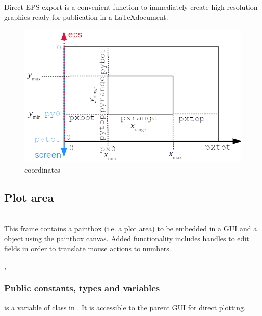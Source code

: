 \documentclass[12pt]{article}
\newcommand\code[1]{{\tt #1}}
\newcommand\guifco[1]{{\color{violet}\code{#1}}}
\newcommand{\opaguif}[1]{\colorbox{violet!30}{{\color{black}\code{#1}}}}
\newcommand{\oguifh}[2]{\subsection{\label{#2}#1}{\Huge\opaguif{#2}}\\}
\newcommand{\oguif}[1]{\hyperref[#1]{\opaguif{#1}}}
\newcommand{\opauni}[1]{\colorbox{orange!30}{{\color{black}\code{#1}}}}
\newcommand{\ouni}[1]{\hyperref[#1]{\opauni{#1}}}
\newcommand{\uses}[1]{\flushleft {\bf Uses:} #1}
\newcommand{\pvar}[1]{\subsubsection*{Public constants, types and variables} #1}
\newcommand{\feature}[1]{{\color{cadmiumgreen} #1}}
\begin{document}
\feature{Direct EPS export is a convenient function to immediately create high resolution graphics ready for publication in a \LaTeX document.}


\begin{figure}\centering
\includegraphics[scale=0.8]{vplotcoor.png}
\caption{\label{vprange}\oguif{../com/vgraph} coordinates}
\end{figure}



\oguifh{Plot area}{../com/asfigure}
This frame contains a paintbox (i.e. a plot area) to be embedded in a GUI and a \guifco{Vplot} object using the paintbox canvas. 
Added functionality includes handles to edit fields in order to translate mouse actions to numbers. 

\uses{\oguif{../com/vgraph}, \ouni{../com/asaux}}

\pvar{
\guifco{plot} is a variable of class \guifco{Vplot} in \oguif{../com/vgraph}. It is accessible to the parent GUI for direct plotting.

}
\end{document}
